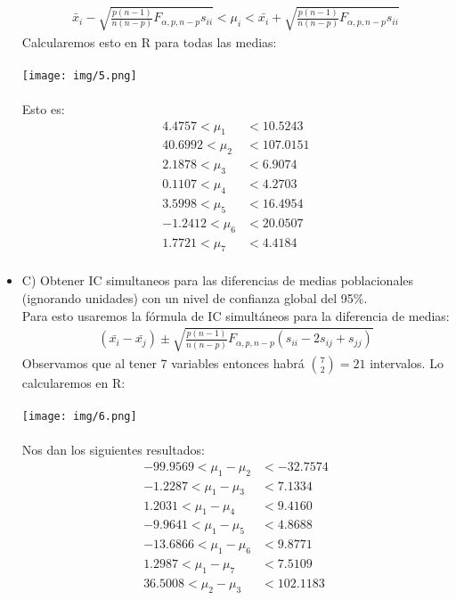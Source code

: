 \begin{sol}
\begin{itemize}
\begin{align*}
\bar{x}_i-\sqrt{\frac{p(n-1)}{n(n-p)}F_{\alpha,p,n-p}s_{ii}}<\mu_i<\bar{x_i}+\sqrt{\frac{p(n-1)}{n(n-p)}F_{\alpha,p,n-p}s_{ii}}
\end{align*}
Calcularemos esto en R para todas las medias:\\\\
\texttt{[image: img/5.png]}\\\\
Esto es:
\begin{align*}
 4.4757 < \mu_1 &< 10.5243 \\
 40.6992 < \mu_2 &< 107.0151 \\
 2.1878 < \mu_3 &< 6.9074 \\
0.1107 < \mu_4 &< 4.2703 \\
3.5998 < \mu_5 &< 16.4954 \\
 -1.2412 < \mu_6 &< 20.0507 \\
 1.7721 < \mu_7 &< 4.4184 \\
\end{align*}
\pagebreak
\item C) Obtener IC simultaneos para las diferencias de medias poblacionales (ignorando  
unidades) con un nivel de confianza global del 95\%. \\
Para esto usaremos la fórmula de IC simultáneos para la diferencia de medias:
\begin{align*}
(\bar{x_i}-\bar{x_j}) \pm \sqrt{\frac{p(n-1)}{n(n-p)}F_{\alpha,p,n-p}(s_{ii}-2s_{ij}+s_{jj})}
\end{align*}
Observamos que al tener 7 variables entonces habrá $\binom{7}{2} = 21$ intervalos. Lo calcularemos en R:\\\\
\texttt{[image: img/6.png]}\\\\
Nos dan los siguientes resultados:
\begin{align*}
 -99.9569 < \mu_{1} - \mu_{2} &< -32.7574 \\
 -1.2287 < \mu_{1} - \mu_{3} &< 7.1334 \\
 1.2031 < \mu_{1} - \mu_{4} &< 9.4160 \\
 -9.9641 < \mu_{1} - \mu_{5} &< 4.8688 \\
 -13.6866 < \mu_{1} - \mu_{6} &< 9.8771 \\
 1.2987 < \mu_{1} - \mu_{7} &< 7.5109 \\
 36.5008 < \mu_{2} - \mu_{3} &< 102.1183 \\

\end{align*}
\end{itemize}
\end{sol}
